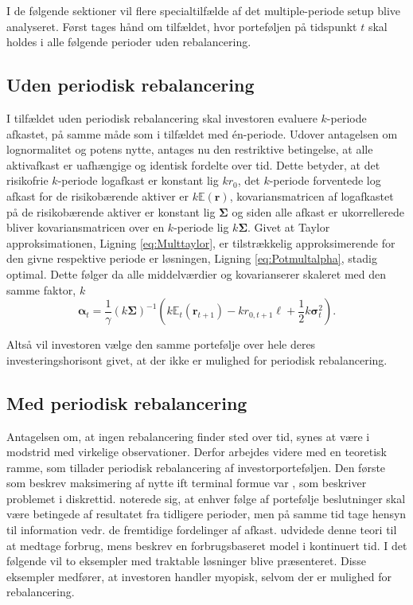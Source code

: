 \documentclass[
  a4paper,
  oneside]{memoir}
\begin{document}
I de følgende sektioner vil flere specialtilfælde af det multiple-periode setup blive analyseret. Først tages hånd om tilfældet, hvor porteføljen på tidspunkt \(t\) skal holdes i alle følgende perioder uden rebalancering.

\hypertarget{uden-periodisk-rebalancering}{%
\subsection{Uden periodisk rebalancering}\label{uden-periodisk-rebalancering}}

I tilfældet uden periodisk rebalancering skal investoren evaluere \(k\)-periode afkastet, på samme måde som i tilfældet med én-periode. Udover antagelsen om lognormalitet og potens nytte, antages nu den restriktive betingelse, at alle aktivafkast er uafhængige og identisk fordelte over tid. Dette betyder, at det risikofrie \(k\)-periode logafkast er konstant lig \(kr_{0}\), det \(k\)-periode forventede log afkast for de risikobærende aktiver er \(k\mathbb{E}(\bm{r})\), kovariansmatricen af logafkastet på de risikobærende aktiver er konstant lig \(\bm{\Sigma}\) og siden alle afkast er ukorrellerede bliver kovariansmatricen over en \(k\)-periode lig \(k\bm{\Sigma}\). Givet at Taylor approksimationen, Ligning \eqref{eq:Multtaylor}, er tilstrækkelig approksimerende for den givne respektive periode er løsningen, Ligning \eqref{eq:Potmultalpha}, stadig optimal. Dette følger da alle middelværdier og kovarianserer skaleret med den samme faktor, \(k\)
\begin{equation}
\bm{\alpha}_t=\frac{1}{\gamma}(k\bm{\Sigma})^{-1}\left(k\mathbb{E}_t(\bm{r}_{t+1})-kr_{0,t+1}\bm{\ell}+\frac{1}{2}k\bm{\sigma}_t^2\right). \label{eq:Potmultalphak}
\end{equation}

Altså vil investoren vælge den samme portefølje over hele deres investeringshorisont givet, at der ikke er mulighed for periodisk rebalancering.

\hypertarget{med-periodisk-rebalancering}{%
\subsection{Med periodisk rebalancering}\label{med-periodisk-rebalancering}}

Antagelsen om, at ingen rebalancering finder sted over tid, synes at være i modstrid med virkelige observationer. Derfor arbejdes videre med en teoretisk ramme, som tillader periodisk rebalancering af investorporteføljen. Den første som beskrev maksimering af nytte ift terminal formue var \citep{Mossin1968}, som beskriver problemet i diskrettid. \citep{Mossin1968} noterede sig, at enhver følge af portefølje beslutninger skal være betingede af resultatet fra tidligere perioder, men på samme tid tage hensyn til information vedr. de fremtidige fordelinger af afkast. \citep{Samuelson1969} udvidede denne teori til at medtage forbrug, mens \citep{Merton1969, Merton1971} beskrev en forbrugsbaseret model i kontinuert tid. I det følgende vil to eksempler med traktable løsninger blive præsenteret. Disse eksempler medfører, at investoren handler myopisk, selvom der er mulighed for rebalancering.
\end{document}
